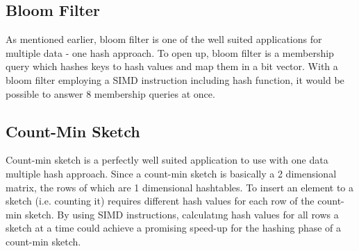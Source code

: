 \documentclass[11pt,oneside,a4paper]{article}
\makeatletter
\def\cleardoublepage{\clearpage\if@twoside \ifodd\c@page\else%
\hbox{}%
\thispagestyle{empty}%
\clearpage%
\if@twocolumn\hbox{}\clearpage\fi\fi\fi}
\makeatother
\begin{document}
\subsection{Bloom Filter}
As mentioned earlier, bloom filter is one of the well suited applications for multiple data - one hash approach. To open up, bloom filter is a membership query which hashes keys to hash values and map them in a bit vector. With a bloom filter employing a SIMD instruction including hash function, it would be possible to answer 8 membership queries at once.
\subsection{Count-Min Sketch}
Count-min sketch is a perfectly well suited application to use with one data multiple hash approach. Since a count-min sketch is basically a 2 dimensional matrix, the rows of which are 1 dimensional hashtables. To insert an element to a sketch (i.e. counting it) requires different hash values for each row of the count-min sketch. By using  SIMD instructions, calculatıng hash values for all rows a sketch at a time could achieve a promising speed-up for the hashing phase of a count-min sketch.
\cleardoublepage
{}

\cleardoublepage
\end{document}
